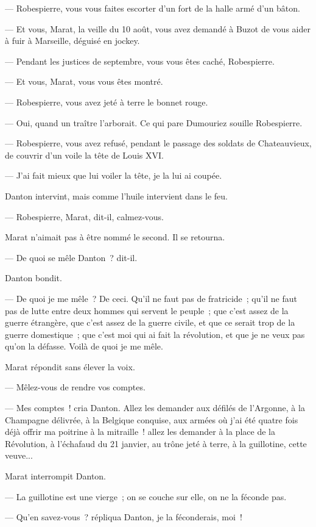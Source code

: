 \documentclass[french,twoside]{book} %
\begin{document}
— Robespierre, vous vous faites escorter d’un fort de la halle armé d’un bâton.\par
— Et vous, Marat, la veille du 10 août, vous avez demandé à Buzot de vous aider à fuir à Marseille, déguisé en jockey.\par
— Pendant les justices de septembre, vous vous êtes caché, Robespierre.\par
— Et vous, Marat, vous vous êtes montré.\par
— Robespierre, vous avez jeté à terre le bonnet rouge.\par
— Oui, quand un traître l’arborait. Ce qui pare Dumouriez souille Robespierre.\par
 — Robespierre, vous avez refusé, pendant le passage des soldats de Chateauvieux, de couvrir d’un voile la tête de Louis XVI.\par
— J’ai fait mieux que lui voiler la tête, je la lui ai coupée.\par
Danton intervint, mais comme l’huile intervient dans le feu.\par
— Robespierre, Marat, dit-il, calmez-vous.\par
Marat n’aimait pas à être nommé le second. Il se retourna.\par
— De quoi se mêle Danton ? dit-il.\par
Danton bondit.\par
— De quoi je me mêle ? De ceci. Qu’il ne faut pas de fratricide ; qu’il ne faut pas de lutte entre deux hommes qui servent le peuple ; que c’est assez de la guerre étrangère, que c’est assez de la guerre civile, et que ce serait trop de la guerre domestique ; que c’est moi qui ai fait la révolution, et que je ne veux pas qu’on la défasse. Voilà de quoi je me mêle.\par
Marat répondit sans élever la voix.\par
— Mêlez-vous de rendre vos comptes.\par
— Mes comptes ! cria Danton. Allez les demander aux défilés de l’Argonne, à la Champagne délivrée, à la Belgique conquise, aux armées où j’ai été quatre fois déjà offrir ma poitrine à la mitraille ! allez les demander à la place de la Révolution, à l’échafaud du 21 janvier, au trône jeté à terre, à la guillotine, cette veuve...\par
Marat interrompit Danton.\par
 — La guillotine est une vierge ; on se couche sur elle, on ne la féconde pas.\par
— Qu’en savez-vous ? répliqua Danton, je la féconderais, moi !\par
\end{document}
